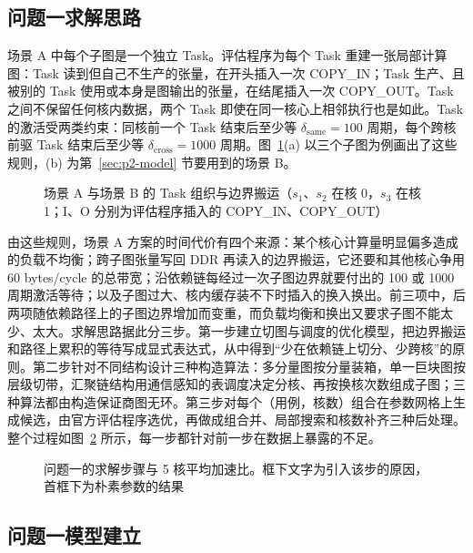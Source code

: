 \subsection{问题一求解思路}

场景 A 中每个子图是一个独立 Task。评估程序为每个 Task 重建一张局部计算图：Task 读到但自己不生产的张量，在开头插入一次 COPY\_IN；Task 生产、且被别的 Task 使用或本身是图输出的张量，在结尾插入一次 COPY\_OUT。Task 之间不保留任何核内数据，两个 Task 即使在同一核心上相邻执行也是如此。Task 的激活受两类约束：同核前一个 Task 结束后至少等 $\delta_{\mathrm{same}}=100$ 周期，每个跨核前驱 Task 结束后至少等 $\delta_{\mathrm{cross}}=1000$ 周期。图~\ref{fig:sceneAB}(a) 以三个子图为例画出了这些规则，(b) 为第~\ref{sec:p2-model} 节要用到的场景 B。

\begin{figure}[H]
  \centering
  
  \caption{场景 A 与场景 B 的 Task 组织与边界搬运（$s_1$、$s_2$ 在核 0，$s_3$ 在核 1；I、O 分别为评估程序插入的 COPY\_IN、COPY\_OUT）}
  \label{fig:sceneAB}
\end{figure}

由这些规则，场景 A 方案的时间代价有四个来源：某个核心计算量明显偏多造成的负载不均衡；跨子图张量写回 DDR 再读入的边界搬运，它还要和其他核心争用 60 bytes/cycle 的总带宽；沿依赖链每经过一次子图边界就要付出的 100 或 1000 周期激活等待；以及子图过大、核内缓存装不下时插入的换入换出。前三项中，后两项随依赖路径上的子图边界增加而变重，而负载均衡和换出又要求子图不能太少、太大。求解思路据此分三步。第一步建立切图与调度的优化模型，把边界搬运和路径上累积的等待写成显式表达式，从中得到“少在依赖链上切分、少跨核”的原则。第二步针对不同结构设计三种构造算法：多分量图按分量装箱，单一巨块图按层级切带，汇聚链结构用通信感知的表调度决定分核、再按换核次数组成子图；三种算法都由构造保证商图无环。第三步对每个（用例，核数）组合在参数网格上生成候选，由官方评估程序选优，再做成组合并、局部搜索和核数补齐三种后处理。整个过程如图~\ref{fig:ladder-p1} 所示，每一步都针对前一步在数据上暴露的不足。

\begin{figure}[H]
  \centering
  
  \caption{问题一的求解步骤与 5 核平均加速比。框下文字为引入该步的原因，首框下为朴素参数的结果}
  \label{fig:ladder-p1}
\end{figure}

\subsection{问题一模型建立}\label{sec:p1-model}

